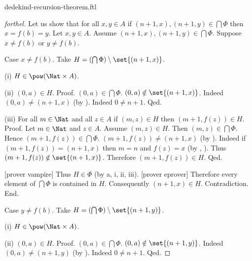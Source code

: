 \documentclass{naproche-library}
\begin{document}
\begin{smodule}{dedekind-recursion-theorem.ftl}
\begin{proof}[forthel]
        Let us show that for all $x, y \in A$ if $(n + 1, x),
        (n + 1, y) \in \bigcap \Phi$ then $x = f(b) = y$.
          Let $x, y \in A$.
          Assume $(n + 1, x), (n + 1, y) \in \bigcap \Phi$.
          Suppose $x \neq f(b)$ or $y \neq f(b)$.

          Case $x \neq f(b)$.
            Take $H = (\bigcap \Phi) \setminus \set{(n + 1,x)}$.

            (i) $H \in \pow(\Nat \times A)$.

            (ii) $(0,a) \in H$. \newline
            Proof.
              $(0,a) \in \bigcap \Phi$.
              $(0,a) \notin \set{(n + 1,x)}$.
              Indeed $(0,a) \neq (n + 1,x)$ (by ).
              Indeed $0 \neq n + 1$.
            Qed.

            (iii) For all $m \in \Nat$ and all $z \in A$ if $(m,z) \in H$ then $(m + 1,f(z)) \in H$. \newline
            Proof.
              Let $m \in \Nat$ and $z \in A$.
              Assume $(m,z) \in H$.
              Then $(m,z) \in \bigcap \Phi$.
              Hence $(m + 1,f(z)) \in \bigcap \Phi$.
              $(m + 1,f(z)) \neq (n + 1,x)$ (by ).
              Indeed if $(m + 1,f(z)) = (n + 1,x)$ then $m = n$ and $f(z) = x$ (by , ).
              Thus $(m + 1,f(z)) \notin \set{(n + 1,x)}$.
              Therefore $(m + 1,f(z)) \in H$.
            Qed.

            [prover vampire]
            Thus $H \in \Phi$ (by a, i, ii, iii).
            [prover eprover]
            Therefore every element of $\bigcap \Phi$ is contained in $H$.
            Consequently $(n + 1,x) \in H$.
            Contradiction.
          End.

          Case $y \neq f(b)$.
            Take $H = (\bigcap \Phi) \setminus \set{(n + 1,y)}$.

            (i) $H \in \pow(\Nat \times A)$.

            (ii) $(0,a) \in H$. \newline
            Proof.
              $(0,a) \in \bigcap \Phi$.
              $(0,a) \notin \set{(n + 1,y)}$.
              Indeed $(0,a) \neq (n + 1,y)$ (by ).
              Indeed $0 \neq n + 1$.
            Qed.


\end{proof}
\end{smodule}
\end{document}

